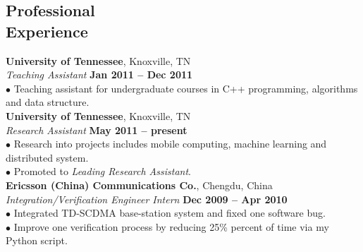 \documentclass[margin,line]{resume}
\begin{document}
\begin{resume}

    \section{\mysidestyle Professional\\Experience}

    \textbf{University of Tennessee}, Knoxville, TN \\\vspace{0mm}%
    \textsl{Teaching Assistant} \hfill \textbf{Jan 2011 -- Dec 2011}\vspace{0mm}\\
    $\bullet$ Teaching assistant for undergraduate courses in C++ programming, algorithms and data structure.\vspace{-5mm}\\
	
    \textbf{University of Tennessee}, Knoxville, TN \\\vspace{0mm}%
    \textsl{Research Assistant} \hfill \textbf{May 2011 -- present}\vspace{0mm}\\
    $\bullet$ Research into projects includes mobile computing, machine learning and distributed system.\vspace{0mm}\\
    $\bullet$ Promoted to \textsl{Leading Research Assistant}.\vspace{-5mm}\\

    \textbf{Ericsson (China) Communications Co.}, Chengdu, China \vspace{0mm}\\%
	\textsl{Integration/Verification Engineer Intern} \hfill \textbf{Dec 2009 -- Apr 2010}\vspace{0mm}\\
    $\bullet$ Integrated TD-SCDMA base-station system and fixed one software bug.\vspace{0mm}\\
    $\bullet$ Improve one verification process by reducing 25\% percent of time via my Python script.\vspace{-1mm}\\


\end{resume}
\end{document}
